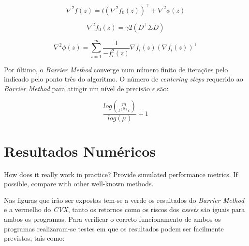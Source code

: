 \documentclass[a4paper]{IEEEtran}
\begin{document}
\begin{equation}
\label{eq.hess}
\nabla^2 f(z) = t (\nabla^2 f_0(z))^\top + \nabla^2 \phi (z)
\end{equation}

\begin{equation}
\label{eq.hesss}
\nabla^2 f_0 (z) = \gamma 2 (D^\top \Sigma D) 
\end{equation}

\begin{equation}
\label{eq.hessss}
\nabla^2 \phi (z) = \sum_{i=1}^{m} \frac{1}{-f_i^2 (z)} \nabla f_i (z) (\nabla f_i (z))^\top
\end{equation}

Por último, o \textit{Barrier Method} converge num número finito de iterações pelo indicado pelo ponto três do algoritmo. O número de \textit{centering steps} requerido ao \textit{Barrier Method} para atingir um nível de precisão $\epsilon$ são:

\begin{equation}
\label{steps}
\frac{log(\frac{m}{t^{(0)}\epsilon})}{log(\mu)} + 1
\end{equation}

\section{Resultados Numéricos}
\label{sec:numerical-results}

How does it really work in practice? Provide simulated performance
metrics. If possible, compare with other well-known methods.

Nas figuras que irão ser expostas tem-se a verde os resultados do \textit{Barrier Method} e a vermelho do \textit{CVX}, tanto os retornos como os riscos dos \textit{assets} são iguais para ambos os programas.
Para verificar o correto funcionamento de ambos os programas realizaram-se testes em que os resultados podem ser facilmente previstos, tais como:
\end{document}
